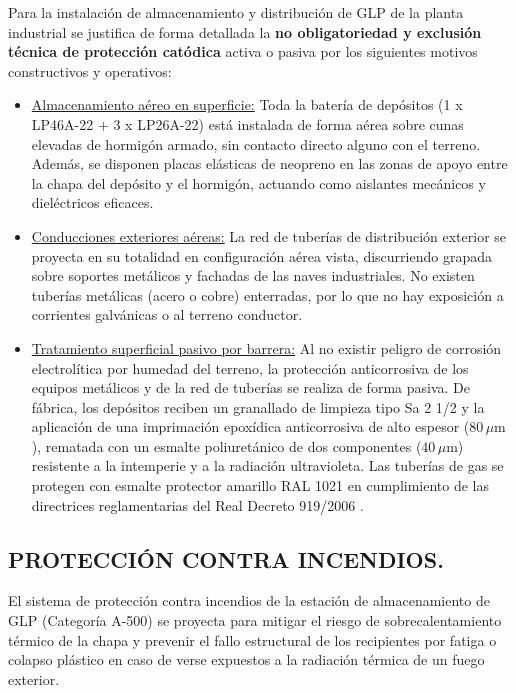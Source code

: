 \documentclass[12pt]{article}
\begin{document}
        Para la instalación de almacenamiento y distribución de GLP de la planta industrial se justifica de forma detallada la \textbf{no obligatoriedad y exclusión técnica de protección catódica} activa o pasiva por los siguientes motivos constructivos y operativos:
        \begin{itemize}
            \item \underline{Almacenamiento aéreo en superficie:} Toda la batería de depósitos (1 x LP46A-22 + 3 x LP26A-22) está instalada de forma aérea sobre cunas elevadas de hormigón armado, sin contacto directo alguno con el terreno. Además, se disponen placas elásticas de neopreno en las zonas de apoyo entre la chapa del depósito y el hormigón, actuando como aislantes mecánicos y dieléctricos eficaces.
            \item \underline{Conducciones exteriores aéreas:} La red de tuberías de distribución exterior se proyecta en su totalidad en configuración aérea vista, discurriendo grapada sobre soportes metálicos y fachadas de las naves industriales. No existen tuberías metálicas (acero o cobre) enterradas, por lo que no hay exposición a corrientes galvánicas o al terreno conductor.
            \item \underline{Tratamiento superficial pasivo por barrera:} Al no existir peligro de corrosión electrolítica por humedad del terreno, la protección anticorrosiva de los equipos metálicos y de la red de tuberías se realiza de forma pasiva. De fábrica, los depósitos reciben un granallado de limpieza tipo Sa 2 1/2 y la aplicación de una imprimación epoxídica anticorrosiva de alto espesor ($80\,\mu\text{m}$), rematada con un esmalte poliuretánico de dos componentes ($40\,\mu\text{m}$) resistente a la intemperie y a la radiación ultravioleta. Las tuberías de gas se protegen con esmalte protector amarillo RAL 1021 en cumplimiento de las directrices reglamentarias del Real Decreto 919/2006 \cite{rd919}.
        \end{itemize}

        \subsection{PROTECCIÓN CONTRA INCENDIOS.}
        El sistema de protección contra incendios de la estación de almacenamiento de GLP (Categoría A-500) se proyecta para mitigar el riesgo de sobrecalentamiento térmico de la chapa y prevenir el fallo estructural de los recipientes por fatiga o colapso plástico en caso de verse expuestos a la radiación térmica de un fuego exterior.
\end{document}
